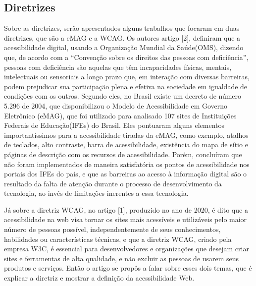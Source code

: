 \documentclass[a4paper]{article}
\begin{document}
\begin{titlepage}
\subsection{Diretrizes}
Sobre as diretrizes, serão apresentados alguns trabalhos que focaram em duas diretrizes, que são a eMAG e a WCAG. Os autores artigo [2], definiram que a acessibilidade digital, usando a Organização Mundial da Saúde(OMS), dizendo que, de acordo com a “Convenção sobre os direitos das pessoas com deficiência”, pessoas com deficiência são aquelas que têm incapacidades físicas, mentais, intelectuais ou sensoriais a longo prazo que, em interação com diversas barreiras, podem prejudicar sua participação plena e efetiva na sociedade em igualdade de condições com os outros. Segundo eles, no Brasil existe um decreto de número 5.296 de 2004, que disponibilizou o Modelo de Acessibilidade em Governo Eletrônico (eMAG), que foi utilizado para analisado 107 sites de Instituições Federais de Educação(IFEs) do Brasil. Eles pontuaram alguns elementos importantíssimos para a acessibilidade tiradas da eMAG, como exemplo, atalhos de teclados, alto contraste, barra de acessibilidade, existência do mapa de sítio e páginas de descrição com os recursos de acessibilidade. Porém, concluíram que não foram implementados de maneira satisfatória os pontos de acessibilidade nos portais dos IFEs do país, e que as barreiras ao acesso à informação digital são o resultado da falta de atenção durante o processo de desenvolvimento da tecnologia, ao invés de limitações inerentes a essa tecnologia.

Já sobre a diretriz WCAG, no artigo [1], produzido no ano de 2020, é dito que a acessibilidade na web visa tornar os sites mais acessíveis e utilizáveis pelo maior número de pessoas possível, independentemente de seus conhecimentos, habilidades ou características técnicas, e que a diretriz WCAG, criado pela empresa W3C, é essencial para desenvolvedores e organizações que desejam criar sites e ferramentas de alta qualidade, e não excluir as pessoas de usarem seus produtos e serviços. Então o artigo se propôs a falar sobre esses dois temas, que é explicar a diretriz e mostrar a definição da acessibilidade Web.


\end{titlepage}
\end{document}
